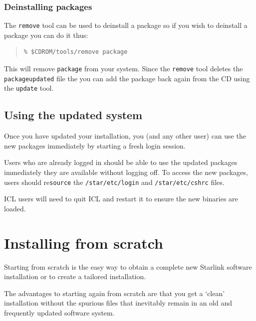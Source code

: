 \documentclass[twoside,11pt]{article}
\newcommand{\xlabel}[1]{}
\renewcommand{\_}{\texttt{\symbol{95}}}
\begin{document}
\subsubsection{\xlabel{deinstalling_packages}Deinstalling packages}
\label{deinstalling_packages}

The \texttt{remove} tool can be used to deinstall a package so if you
wish to deinstall a package you can do it thus:

\begin{quote}
\begin{verbatim}
% $CDROM/tools/remove package
\end{verbatim}
\end{quote}

This will remove \texttt{package} from your system.  Since the
\texttt{remove} tool deletes the \texttt{package\_updated} file the
you can add the package back again from the CD using the
\texttt{update} tool.

\subsection{\xlabel{using_the_updated_system}Using the updated system}
\label{using_the_updated_system}

Once you have updated your installation, you (and any other user) can
use the new packages immediately by starting a fresh login session.

Users who are already logged in should be able to use the updated
packages immediately they are available without logging off.  To access
the new packages, users should re\texttt{source} the \texttt{/star/etc/login}
and \texttt{/star/etc/cshrc} files.

ICL users will need to quit ICL and restart it to ensure the new binaries
are loaded.

\newpage
\section{\xlabel{installing_from_scratch}Installing from scratch}
\label{installing_from_scratch}

Starting from scratch is the easy way to obtain a complete new Starlink
software installation or to create a tailored installation.

The advantages to starting again from scratch are that you get a `clean'
installation without the spurious files that inevitably remain in an old
and frequently updated software system.
\end{document}
